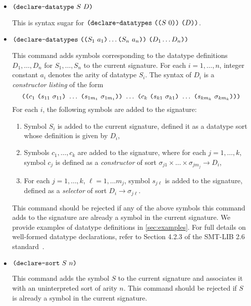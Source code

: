 \documentclass[english,a4paper,10pt]{article}
\begin{document}
\begin{itemize}
\item $\texttt{(}\texttt{declare-datatype}\mbox{ }S\mbox{ }D\texttt{)}$

This is syntax sugar for
$\texttt{(}\texttt{declare-datatypes}\mbox{ }\texttt{(}\texttt{(}S\mbox{ }0\texttt{)} \texttt{)}\mbox{ }\texttt{(}D\texttt{)}\texttt{)}$.

\item $\texttt{(}\texttt{declare-datatypes}\mbox{ }\texttt{(}\texttt{(}S_1\mbox{ }a_1\texttt{)}\ldots\texttt{(}S_n\mbox{ }a_n\texttt{)} \texttt{)}\mbox{ }\texttt{(}D_1 \ldots D_n\texttt{)}\texttt{)}$

This command adds symbols corresponding to the datatype
definitions $D_1, \ldots, D_n$ for $S_1, \ldots, S_n$ 
to the current signature.
For each $i = 1, \ldots, n$, integer constant $a_i$ denotes the arity of 
datatype $S_i$.
The syntax of 
$D_i$ is a \emph{constructor listing} of the form
\[
\texttt{(}
\texttt{(}c_1\mbox{ }\texttt{(}s_{11}\mbox{ }\sigma_{11}\texttt{)}\mbox{ }\ldots\mbox{ }\texttt{(}s_{1m_1}\mbox{ }\sigma_{1m_1}\texttt{)} \texttt{)}
\mbox{ }\ldots\mbox{ }
\texttt{(}c_k\mbox{ }\texttt{(}s_{k1}\mbox{ }\sigma_{k1}\texttt{)}\mbox{ }\ldots\mbox{ }\texttt{(}s_{km_k}\mbox{ }\sigma_{km_k}\texttt{)} \texttt{)}
\texttt{)}
\]
For each $i$, the following symbols are added to the signature:
\begin{enumerate}
\item 
Symbol $S_i$ is added to the current signature,
defined it as a datatype sort whose definition is given by $D_i$,
\item 
Symbols $c_1, \ldots, c_k$ are added to the signature,
where
for each $j = 1, \ldots, k$, symbol $c_j$
is defined as a \emph{constructor}
of sort $\sigma_{j1} \times \ldots \times \sigma_{jm_j} \rightarrow D_i$,
\item 
For each $j = 1, \ldots, k$, $\ell = 1, \ldots m_j$, symbol $s_{j\ell}$
is added to the signature,
defined as a \emph{selector}
of sort $D_i \rightarrow \sigma_{j\ell}$.
\end{enumerate}

This command should be rejected if any of the above symbols this command
adds to the signature are already
a symbol in the current signature.
We provide examples of datatype definitions in \cref{sec:examples}.
For full details on well-formed datatype declarations,
refer to Section 4.2.3 of the SMT-LIB 2.6 standard~\cite{BarFT-RR-17}.

\item $\texttt{(}\texttt{declare-sort}\mbox{ }S\mbox{ }n\texttt{)}$

This command adds the symbol $S$ to the current signature
and associates it with an uninterpreted sort of arity $n$.
This command should be rejected if $S$ is already
a symbol in the current signature.

\end{itemize}
\end{document}
